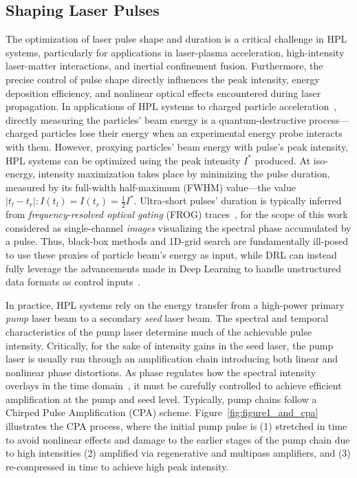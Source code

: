 \subsection{Shaping Laser Pulses}
The optimization of laser pulse shape and duration is a critical challenge in HPL systems, particularly for applications in laser-plasma acceleration, high-intensity laser-matter interactions, and inertial confinement fusion. 
Furthermore, the precise control of pulse shape directly influences the peak intensity, energy deposition efficiency, and nonlinear optical effects encountered during laser propagation. In applications of HPL systems to charged particle acceleration~\citep{grittani2020device}, directly measuring the particles' beam energy is a quantum-destructive process---charged particles lose their energy when an experimental energy probe interacts with them.
However, proxying particles' beam energy with pulse's peak intensity, HPL systems can be optimized using the peak intensity \( I^* \) produced. 
At iso-energy, intensity maximization takes place by minimizing the pulse duration, measured by its full-width half-maximum (FWHM) value---the value \( \vert t_l - t_r \vert: I(t_l)=I(t_r)= \frac 12 I^* \). Ultra-short pulses' duration is typically inferred from \emph{frequency-resolved optical gating} (FROG) traces~\citep{trebino1993using}, for the scope of this work considered as single-channel \textit{images} visualizing the spectral phase accumulated by a pulse. 
Thus, black-box methods and 1D-grid search are fundamentally ill-posed to use these proxies of particle beam's energy as input, while DRL can instead fully leverage the advancements made in Deep Learning to handle unstructured data formats as control inputs~\citep{mnih2013playing}.

In practice, HPL systems rely on the energy transfer from a high-power primary \textit{pump} laser beam to a secondary \textit{seed} laser beam. The spectral and temporal characteristics of the pump laser determine much of the achievable pulse intensity. Critically, for the sake of intensity gains in the seed laser, the pump laser is usually run through an amplification chain introducing both linear and nonlinear phase distortions. As phase regulates how the spectral intensity overlays in the time domain~\citep{paschotta2008field}, it must be carefully controlled to achieve efficient amplification at the pump and seed level. 
Typically, pump chains follow a Chirped Pulse Amplification (CPA) scheme. Figure~\ref{fig:figure1_and_cpa} illustrates the CPA process, where the initial pump pulse is (1) stretched in time to avoid nonlinear effects and damage to the earlier stages of the pump chain due to high intensities (2) amplified via regenerative and multipass amplifiers, and (3) re-compressed in time to achieve high peak intensity.

